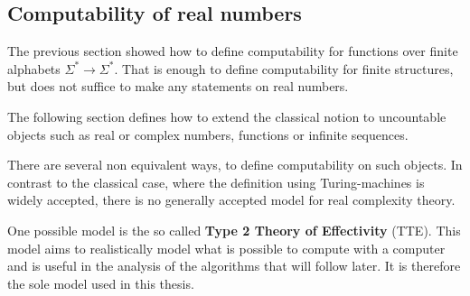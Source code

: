 \subsection{Computability of real numbers}
The previous section showed how to define computability for functions over finite alphabets $\Sigma^* \to \Sigma^*$. 
That is enough to define computability for finite structures, but does not
suffice to make any statements on real numbers.

The following section defines how to extend the classical notion to uncountable
objects such as real or complex numbers, functions or infinite sequences.

There are several non equivalent ways, to define computability on such objects. 
In contrast to the classical case, where the definition using Turing-machines is widely accepted, there is no 
generally accepted model for real complexity theory.

One possible model is the so called \textbf{Type 2 Theory of Effectivity}
(TTE). \cite{Weihrauch} 
This model aims to realistically model what is possible to compute with a
computer and is useful in the analysis of the algorithms that will follow
later.
It is therefore the sole model used in this thesis. 

